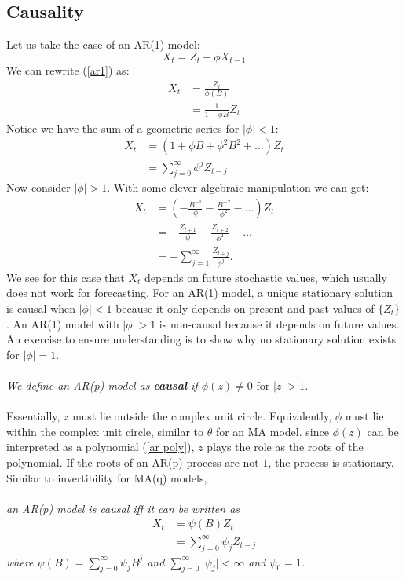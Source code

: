 \documentclass{article}
\begin{document}
\subsection{Causality}
Let us take the case of an AR(1) model:
\begin{equation}\label{ar1}
    X_t = Z_t + \phi X_{t-1}\nonumber
\end{equation}
We can rewrite (\ref{ar1}) as:
\begin{align}\label{ar1 soln}
    X_t &= \frac{Z_t}{\phi(B)}\nonumber\\
    &= \frac{1}{1-\phi B} Z_t
\end{align}
Notice we have the sum of a geometric series for $\lvert \phi \rvert < 1$:
\begin{align}\label{ar less 1}
    X_t &= (1 + \phi B + \phi^2 B^2 + \ldots)Z_t\nonumber\\
    &= \sum_{j=0}^{\infty} \phi^j Z_{t-j}
\end{align}
Now consider $\lvert \phi \rvert > 1$. With some clever algebraic manipulation we can get:
\begin{align}\label{ar greater 1}
    X_t &= (-\frac{B^{-1}}{\phi}-\frac{B^{-2}}{\phi^2}-\ldots)Z_t\nonumber\\
    &= -\frac{Z_{t+1}}{\phi} -\frac{Z_{t+2}}{\phi^2}-\ldots\nonumber\\
    &= - \sum_{j=1}^{\infty}\frac{Z_{t+j}}{\phi^j}.
\end{align}
We see for this case that $X_t$ depends on future stochastic values, which usually does not work for forecasting. For an AR(1) model, a unique stationary solution is causal when $\lvert \phi \rvert < 1$ because it only depends on present and past values of $\{Z_t\}$. An AR(1) model with $\lvert \phi \rvert > 1$ is non-causal because it depends on future values. An exercise to ensure understanding is to show why no stationary solution exists for $\lvert \phi \rvert=1$.\\\\
\textit{We define an AR(p) model as \textbf{causal} if $\phi(z)\neq 0 \text{ for } \lvert z \rvert > 1$.}\\\\
Essentially, $z$ must lie outside the complex unit circle. Equivalently, $\phi$ must lie within the complex unit circle, similar to $\theta$ for an MA model. since $\phi(z)$ can be interpreted as a polynomial (\ref{ar poly}), $z$ plays the role as the roots of the polynomial. If the roots of an AR(p) process are not $1$, the process is stationary. Similar to invertibility for MA(q) models,\\\\
\textit{an AR(p) model is causal iff it can be written as
\begin{align}\label{causal}
    X_t &=\psi(B)Z_t\nonumber\\
    &= \sum_{j=0}^{\infty}\psi_j Z_{t-j}
\end{align}
where $\psi(B)=\sum_{j=0}^{\infty}\psi_j B^j$ and $\sum_{j=0}^{\infty}\lvert \psi_j \rvert < \infty$ and $\psi_0=1$.}
\end{document}
